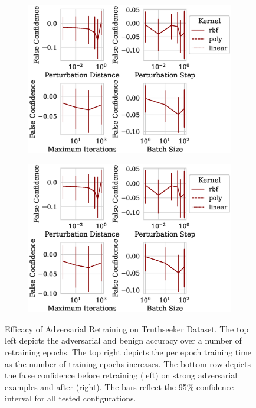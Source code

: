\documentclass[fonts]{icst}
\begin{document}
\begin{appendices}
\begin{figure}[h!]
     \hfill
     \begin{subfigure}{0.47\textwidth}
         \centering
         \includegraphics[width=\textwidth]{./truthseeker/confidence_vs_attack_parameters.eps}
     \end{subfigure}
     \hfill
     \begin{subfigure}{0.47\textwidth}
         \centering
         \includegraphics[width=\textwidth]{./truthseeker/retrain_confidence_vs_attack_parameters.eps}
     \end{subfigure}
     \hfill
     \caption{Efficacy of Adversarial Retraining on Truthseeker Dataset. The top left depicts the adversarial and benign accuracy over a number of retraining epochs. The top right depicts the per epoch training time as the number of training epochs increases. The bottom row depicts the false confidence before retraining (left) on strong adversarial examples and after (right).  The bars reflect the 95\% confidence interval for all tested configurations.}
     \label{fig:truthseeker}
\end{figure}
\end{appendices}
\end{document}
